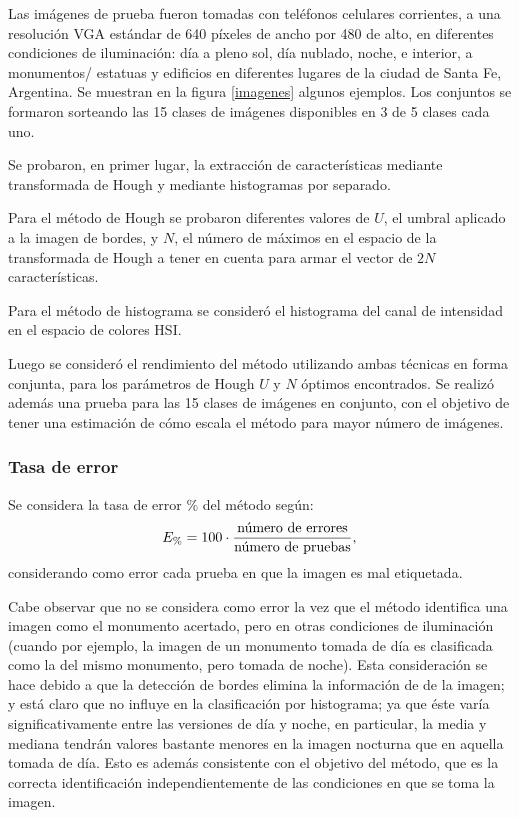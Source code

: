 \documentclass[conference,spanish,a4paper,10pt,oneside,final]{tfmpd}
\begin{document}
Las imágenes de prueba fueron tomadas con teléfonos celulares corrientes, a una
resolución VGA estándar de 640 píxeles de ancho por 480 de alto, en
diferentes condiciones
de iluminación: día a pleno sol, día nublado, noche, e interior, a monumentos/%
estatuas y edificios en diferentes lugares de la ciudad de Santa Fe, Argentina.
Se muestran en la figura \ref{imagenes} algunos ejemplos.
Los conjuntos se formaron sorteando las 15 clases de imágenes disponibles en
3 de 5 clases cada uno.

Se probaron, en primer lugar, la extracción de características mediante
transformada de Hough y mediante histogramas por separado.

Para el método de Hough se probaron diferentes valores de $U$, el umbral
aplicado a la imagen de bordes, y $N$, el número de máximos en el espacio de
la transformada de Hough a tener en cuenta para armar el vector de $2N$
características.

Para el método de histograma se consideró el histograma del canal de
intensidad en el espacio de colores HSI.

Luego se consideró el rendimiento del método utilizando ambas técnicas en
forma conjunta, para los parámetros de Hough $U$ y $N$ óptimos encontrados.
Se realizó además una prueba para las 15 clases de imágenes en conjunto,
con el objetivo de tener una estimación de cómo escala el método para
mayor número de imágenes.

\subsubsection*{Tasa de error}
Se considera la tasa de error $\%$ del método según:
\begin{equation}
E_\%=100\cdot\frac{\textrm{número de errores}}{\textrm{número de pruebas}},
\end{equation}
considerando como error cada prueba en que la imagen es mal etiquetada.

Cabe observar que no se considera como error la vez que el método identifica
una imagen como el monumento acertado, pero en otras
condiciones de iluminación (cuando por ejemplo, la imagen de un monumento
tomada de día es clasificada como la del mismo monumento, pero tomada de noche).
Esta consideración se hace debido a que la detección de bordes elimina la
información de   de la imagen; y está claro que no influye
en la clasificación por histograma; ya que éste varía significativamente
entre las versiones de día y noche, en particular, la media y mediana tendrán
valores bastante menores en la imagen nocturna que en aquella tomada de día.
Esto es además consistente con el objetivo del método, que es la correcta
identificación independientemente de las condiciones en que se toma la imagen.
%
%
\end{document}

